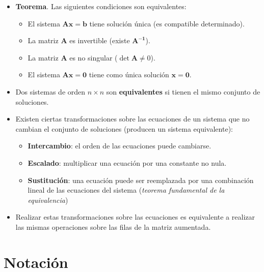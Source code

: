 \documentclass[openany]{book}
\providecommand{\tightlist}{%
  \setlength{\itemsep}{0pt}\setlength{\parskip}{0pt}}
\begin{document}
\begin{itemize}
\item
  \textbf{Teorema}. Las siguientes condiciones son equivalentes:

  \begin{itemize}
  \tightlist
  \item
    El sistema \(\mathbf{Ax=b}\) tiene solución única (es compatible determinado).
  \item
    La matriz \(\mathbf{A}\) es invertible (existe \(\mathbf{A^{-1}}\)).
  \item
    La matriz \(\mathbf{A}\) es no singular (\(\det \mathbf{A} \neq 0\)).
  \item
    El sistema \(\mathbf{Ax=0}\) tiene como única solución \(\mathbf{x=0}\).
  \end{itemize}
\item
  Dos sistemas de orden \(n \times n\) son \textbf{equivalentes} si tienen el mismo conjunto de soluciones.
\item
  Existen ciertas transformaciones sobre las ecuaciones de un sistema que no cambian el conjunto de soluciones (producen un sistema equivalente):

  \begin{itemize}
  \tightlist
  \item
    \textbf{Intercambio}: el orden de las ecuaciones puede cambiarse.
  \item
    \textbf{Escalado}: multiplicar una ecuación por una constante no nula.
  \item
    \textbf{Sustitución}: una ecuación puede ser reemplazada por una combinación lineal de las ecuaciones del sistema (\emph{teorema fundamental de la equivalencia})
  \end{itemize}
\item
  Realizar estas transformaciones sobre las ecuaciones es equivalente a realizar las mismas operaciones sobre las filas de la matriz aumentada.
\end{itemize}

\hypertarget{notaciuxf3n}{%
\section{Notación}\label{notaciuxf3n}}
\end{document}

